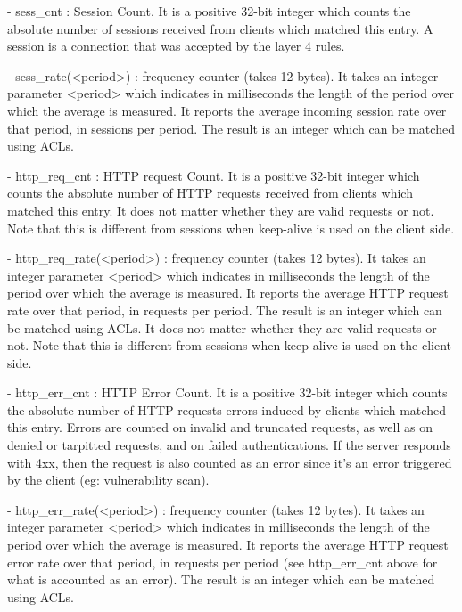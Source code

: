     - sess_cnt : Session Count. It is a positive 32-bit integer which counts
      the absolute number of sessions received from clients which matched this
      entry. A session is a connection that was accepted by the layer 4 rules.

    - sess_rate(<period>) : frequency counter (takes 12 bytes). It takes an
      integer parameter <period> which indicates in milliseconds the length
      of the period over which the average is measured. It reports the average
      incoming session rate over that period, in sessions per period. The
      result is an integer which can be matched using ACLs.

    - http_req_cnt : HTTP request Count. It is a positive 32-bit integer which
      counts the absolute number of HTTP requests received from clients which
      matched this entry. It does not matter whether they are valid requests or
      not. Note that this is different from sessions when keep-alive is used on
      the client side.

    - http_req_rate(<period>) : frequency counter (takes 12 bytes). It takes an
      integer parameter <period> which indicates in milliseconds the length
      of the period over which the average is measured. It reports the average
      HTTP request rate over that period, in requests per period. The result is
      an integer which can be matched using ACLs. It does not matter whether
      they are valid requests or not. Note that this is different from sessions
      when keep-alive is used on the client side.

    - http_err_cnt : HTTP Error Count. It is a positive 32-bit integer which
      counts the absolute number of HTTP requests errors induced by clients
      which matched this entry. Errors are counted on invalid and truncated
      requests, as well as on denied or tarpitted requests, and on failed
      authentications. If the server responds with 4xx, then the request is
      also counted as an error since it's an error triggered by the client
      (eg: vulnerability scan).

    - http_err_rate(<period>) : frequency counter (takes 12 bytes). It takes an
      integer parameter <period> which indicates in milliseconds the length
      of the period over which the average is measured. It reports the average
      HTTP request error rate over that period, in requests per period (see
      http_err_cnt above for what is accounted as an error). The result is an
      integer which can be matched using ACLs.


